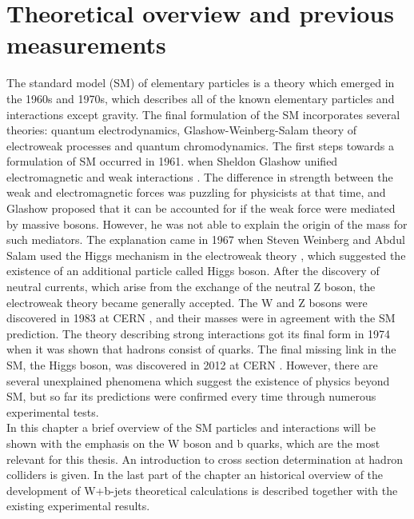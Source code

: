 
\chapter{Theoretical overview and previous measurements} %

\label{Chapter2} 


The standard model (SM) of elementary particles is a theory which emerged in the 1960s and 1970s, which describes all of the known elementary particles and interactions except gravity. The final formulation of the SM incorporates several theories: quantum electrodynamics, Glashow-Weinberg-Salam theory of electroweak processes and quantum chromodynamics. The first steps towards a formulation of SM occurred in 1961. when Sheldon Glashow unified electromagnetic and weak interactions \cite{Glashow1961579}. The difference in strength between the weak and electromagnetic forces was puzzling for physicists at that time, and Glashow proposed that it can be accounted for if the weak force were mediated by massive bosons. However, he was not able to explain the origin of the mass for such mediators. The explanation came in 1967 when Steven Weinberg and Abdul Salam used the Higgs mechanism in the electroweak theory \cite{PhysRevLett.19.1264,Salam:1968rm}, which suggested the existence of an additional particle called Higgs boson. After the discovery of neutral currents, which arise from the exchange of the neutral Z boson, the electroweak theory became generally accepted. The W and Z bosons were discovered in 1983 at CERN \cite{Arnison1983103,Arnison1983398}, and their masses were in agreement with the SM prediction. The theory describing strong interactions got its final form in 1974 when it was shown that hadrons consist of quarks. The final missing link in the SM, the Higgs boson, was discovered in 2012 at CERN \cite{Aad:2012tfa,Chatrchyan:2012ufa}. However, there are several unexplained phenomena which suggest the existence of physics beyond SM, but so far its predictions were confirmed every time through numerous experimental tests.  \\
In this chapter a brief overview of the SM particles and interactions will be shown with the emphasis on the W boson and b quarks, which are the most relevant for this thesis. An introduction to cross section determination at hadron colliders is given. In the last part of the chapter an historical overview of the development of W+b-jets theoretical calculations is described together with the existing experimental results.

